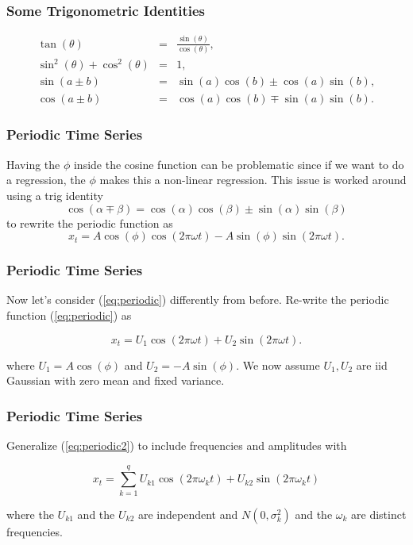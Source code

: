 \documentclass[%
xcolor=pdftex]{beamer}
\begin{document}
\begin{frame}
\frametitle{Some Trigonometric Identities}

\begin{eqnarray*}
\tan(\theta) &=& \frac{\sin(\theta)}{\cos(\theta)}, \\
\sin^2(\theta) + \cos^2(\theta) &=& 1, \\
\sin(a \pm b) &=& \sin(a) \cos(b) \pm \cos(a) \sin(b), \\
\cos(a \pm b) &=& \cos(a) \cos(b) \mp \sin(a) \sin(b).
\end{eqnarray*}

\end{frame}

\begin{frame}
\frametitle{Periodic Time Series}

Having the $\phi$ inside the cosine function can be problematic since if we want to do a regression,
the $\phi$ makes this a non-linear regression. This issue is worked around using a trig identity
$$
\cos(\alpha \mp \beta)=\cos(\alpha) \cos(\beta) \pm \sin(\alpha) \sin(\beta)
$$
to rewrite the periodic function as
\begin{equation} \label{eq:periodic}
x_t=A \cos(\phi) \cos(2 \pi \omega t)-A \sin(\phi) \sin(2 \pi \omega t).
\end{equation}

\end{frame}

\begin{frame}
\frametitle{Periodic Time Series}

Now let's consider (\ref{eq:periodic}) differently from before. Re-write the periodic function (\ref{eq:periodic}) as

\begin{equation} \label{eq:periodic2}
x_t=U_1 \cos(2 \pi \omega t)+U_2 \sin(2 \pi \omega t).
\end{equation}

where $U_1 = A \cos(\phi)$ and $U_2 = -A \sin(\phi)$. We now assume $U_1, U_2$ are iid Gaussian with zero mean and fixed variance.

\end{frame}





\begin{frame}
\frametitle{Periodic Time Series}

Generalize (\ref{eq:periodic2}) to include \underline{\hspace{15 mm}} frequencies and amplitudes with

\begin{equation} \label{eq:gen}
x_t = \sum_{k=1}^{q} U_{k1} \cos(2 \pi \omega_k t) + U_{k2} \sin(2 \pi \omega_k t)
\end{equation}

where the $U_{k1}$ and the $U_{k2}$ are independent and $N(0 , \sigma_k^2)$ and the $\omega_k$ are distinct frequencies.

\end{frame}
\end{document}
